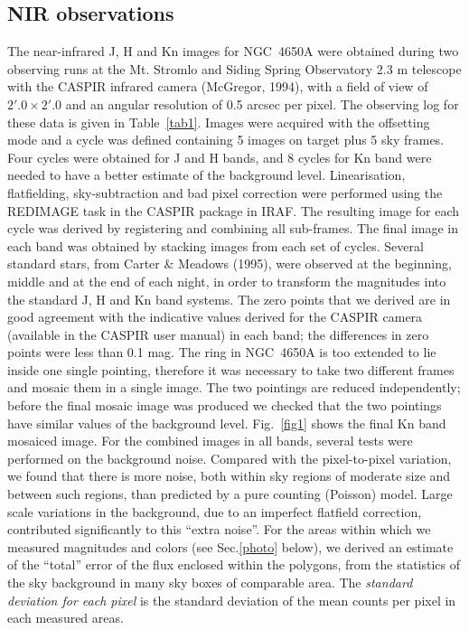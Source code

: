 \documentclass[preprint]{aastex}
\begin{document}
\subsection{NIR observations}\label{NIRobs}
The near-infrared J, H and Kn images for NGC~4650A were obtained during two
observing runs at the Mt. Stromlo and Siding Spring Observatory 2.3 m
telescope with the CASPIR infrared camera (McGregor, 1994), 
with a field of view
of $2'.0 \times 2'.0$ and an angular resolution of 0.5 arcsec per pixel.
The observing log for these data is given in Table~\ref{tab1}.
Images were acquired with the offsetting mode and a cycle was defined 
containing 5 images on target plus 5 sky frames. 
Four cycles were obtained for J and H bands, and 8 cycles for Kn band were 
needed to have a better estimate of the background level.
Linearisation, flatfielding, sky-subtraction and bad pixel correction were
performed using the REDIMAGE task in the CASPIR package in IRAF. The resulting 
image for each cycle was derived by registering and combining all sub-frames. 
The final image  in each band was obtained by stacking images from each 
set of cycles.
Several standard stars, from Carter \& Meadows (1995), were observed at the
beginning, middle and at the end of each night, in order to transform
the magnitudes into the standard J, H and Kn band systems. 
The zero points that we derived are in good agreement with the indicative values
derived for the CASPIR camera (available in the CASPIR user manual) in each 
band; the differences in zero points were less than 0.1 mag.
The ring in NGC~4650A is too extended to lie inside one single pointing,
therefore it was necessary to take two different frames and mosaic them in
a single image. 
The two pointings are reduced independently; before the final
mosaic image was produced we checked that the two pointings have similar values
of the background level. 
Fig.~\ref{fig1} shows the final Kn band mosaiced image. 
For the combined images in all bands, several tests were performed on the 
background noise. 
Compared with the pixel-to-pixel variation, we 
found that there is more noise, both within sky regions of moderate
size and between such regions, than predicted by a pure counting
(Poisson) model.  
Large scale variations in the background, due to an imperfect flatfield correction,
contributed significantly to this ``extra noise''.
For the areas within which we measured magnitudes and colors (see
Sec.\ref{photo} below), we derived an estimate of the ``total'' error 
of the flux enclosed within the polygons, 
from the statistics of the sky background in many sky boxes of comparable area.
The {\it standard deviation for each pixel} is the standard deviation 
of the mean counts per pixel in each measured areas.
\end{document}
